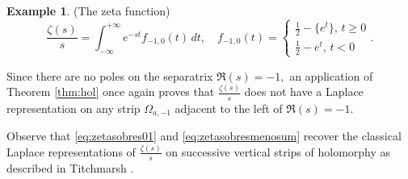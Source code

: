 \documentclass[12pt]{article}
\theoremstyle{definition}
\newtheorem{example}[theorem]{Example}
\begin{document}
\begin{example}{(The zeta function)}
\begin{equation}\label{eq:zetasobresmenosum}
     \frac{\zeta(s)}{s}= \int_{-\infty}^{+ \infty}e^{-st}f_{-1,0}(t) \,dt, \quad f_{-1,0}(t)= \begin{cases}
         \frac{1}{2}- \{e^t \}, \, t \geq 0 \\
    \frac{1}{2}-e^t, \, t<0
    \end{cases}.
\end{equation}

Since there are no poles  on the separatrix $\Re(s)=-1,$ an application of Theorem \ref{thm:hol} once again proves that  \(\frac{\zeta(s)}{s}\) does not have a Laplace representation on any strip \(\Omega_{a,-1}\) adjacent to the left of $\Re(s)=-1.$ 

Observe that \eqref{eq:zetasobres01} and \eqref{eq:zetasobresmenosum} recover the classical Laplace representations of \(\frac{\zeta(s)}{s}\) on successive vertical strips of holomorphy as described in   Titchmarsh \cite{TitchmarshZeta}.

\end{example}
\end{document}
